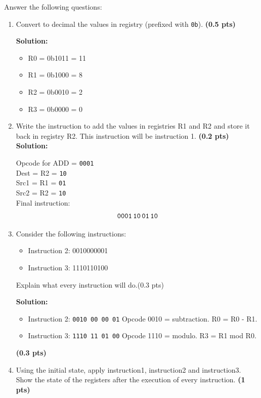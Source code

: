 \documentclass[10pt]{article}
\begin{document}
Answer the following questions: 
\begin{enumerate}
    \item Convert to decimal the values in registry (prefixed with \verb|0b|). \textbf{(0.5 pts)}
    
    \textbf{Solution:}
    \begin{itemize}
        \item R0 = 0b1011 = 11
        \item R1 = 0b1000 = 8
        \item R2 = 0b0010 = 2
        \item R3 = 0b0000 = 0
    \end{itemize}
    \item Write the instruction to add the values in registries R1 and R2 and store it back in registry R2. This instruction will be instruction 1. \textbf{(0.2 pts)}\\
    
    \textbf{Solution:}
    
    Opcode for ADD = \texttt{0001}\\
    Dest = R2 = \texttt{10}\\
    Src1 = R1 = \texttt{01}\\
    Src2 = R2 = \texttt{10}\\
    
    Final instruction:
    \[
    \texttt{0001\,10\,01\,10}
    \]

    \item Consider the following instructions:
    \begin{itemize}
        \item Instruction 2: 0010000001
        \item Instruction 3: 1110110100
    \end{itemize}
    Explain what every instruction will do.(0.3 pts)

    \textbf{Solution:}
    \begin{itemize}
        \item Instruction 2: \texttt{0010 00 00 01}  
        Opcode 0010 = subtraction.  
        R0 = R0 - R1.
        
        \item Instruction 3: \texttt{1110 11 01 00}  
        Opcode 1110 = modulo.  
        R3 = R1 mod R0.
    \end{itemize}
    \textbf{(0.3 pts)}
    \item Using the initial state, apply instruction1, instruction2 and instruction3. Show the state
of the registers after the execution of every instruction. \textbf{(1 pts)}      


\end{enumerate}
\end{document}
